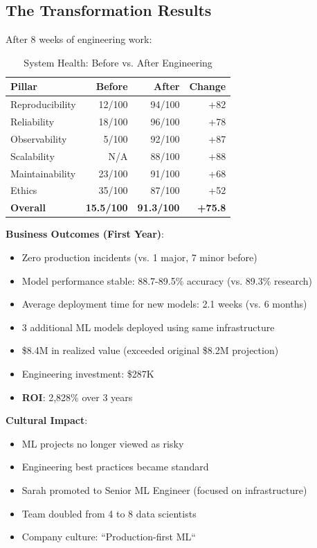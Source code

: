 \subsection{The Transformation Results}

After 8 weeks of engineering work:

\begin{table}[h]
\centering
\caption{System Health: Before vs. After Engineering}
\begin{tabular}{lrrr}
\toprule
\textbf{Pillar} & \textbf{Before} & \textbf{After} & \textbf{Change} \\
\midrule
Reproducibility & 12/100 & 94/100 & +82 \\
Reliability & 18/100 & 96/100 & +78 \\
Observability & 5/100 & 92/100 & +87 \\
Scalability & N/A & 88/100 & +88 \\
Maintainability & 23/100 & 91/100 & +68 \\
Ethics & 35/100 & 87/100 & +52 \\
\midrule
\textbf{Overall} & \textbf{15.5/100} & \textbf{91.3/100} & \textbf{+75.8} \\
\bottomrule
\end{tabular}
\end{table}

\textbf{Business Outcomes (First Year)}:
\begin{itemize}
    \item Zero production incidents (vs. 1 major, 7 minor before)
    \item Model performance stable: 88.7-89.5\% accuracy (vs. 89.3\% research)
    \item Average deployment time for new models: 2.1 weeks (vs. 6 months)
    \item 3 additional ML models deployed using same infrastructure
    \item \$8.4M in realized value (exceeded original \$8.2M projection)
    \item Engineering investment: \$287K
    \item \textbf{ROI}: 2,828\% over 3 years
\end{itemize}

\textbf{Cultural Impact}:
\begin{itemize}
    \item ML projects no longer viewed as risky
    \item Engineering best practices became standard
    \item Sarah promoted to Senior ML Engineer (focused on infrastructure)
    \item Team doubled from 4 to 8 data scientists
    \item Company culture: ``Production-first ML``
\end{itemize}


